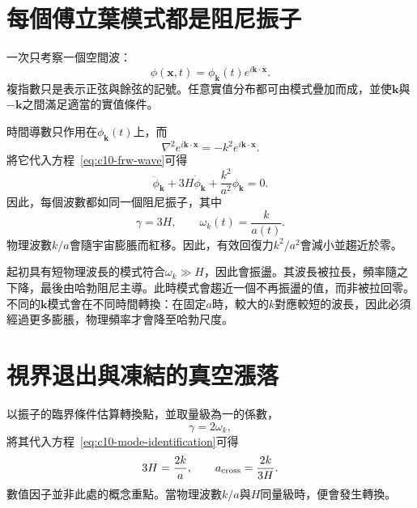 \begin{classroomqa}
\end{classroomqa}

\section{每個傅立葉模式都是阻尼振子}

一次只考察一個空間波：
\begin{equation}
\phi(\mathbf x,t)
=\phi_{\mathbf k}(t)e^{i\mathbf k\cdot\mathbf x}.
\label{eq:c10-mode-ansatz}
\end{equation}
複指數只是表示正弦與餘弦的記號。任意實值分布都可由模式疊加而成，並使\(\mathbf k\)與\(-\mathbf k\)之間滿足適當的實值條件。

時間導數只作用在\(\phi_{\mathbf k}(t)\)上，而
\[
\nabla^2e^{i\mathbf k\cdot\mathbf x}
=-k^2e^{i\mathbf k\cdot\mathbf x}.
\]
將它代入方程~\eqref{eq:c10-frw-wave}可得
\begin{equation}
\ddot\phi_{\mathbf k}
+3H\dot\phi_{\mathbf k}
+\frac{k^2}{a^2}\phi_{\mathbf k}=0.
\label{eq:c10-mode-equation}
\end{equation}
因此，每個波數都如同一個阻尼振子，其中
\begin{equation}
\gamma=3H,
\qquad
\omega_k(t)=\frac{k}{a(t)}.
\label{eq:c10-mode-identification}
\end{equation}
物理波數\(k/a\)會隨宇宙膨脹而紅移。因此，有效回復力\(k^2/a^2\)會減小並趨近於零。

起初具有短物理波長的模式符合\(\omega_k\gg H\)，因此會振盪。其波長被拉長，頻率隨之下降，最後由哈勃阻尼主導。此時模式會趨近一個不再振盪的值，而非被拉回零。不同的\(\mathbf k\)模式會在不同時間轉換：在固定\(a\)時，較大的\(k\)對應較短的波長，因此必須經過更多膨脹，物理頻率才會降至哈勃尺度。

\section{視界退出與凍結的真空漲落}

以振子的臨界條件估算轉換點，並取量級為一的係數，
\[
\gamma=2\omega_k,
\]
將其代入方程~\eqref{eq:c10-mode-identification}可得
\begin{equation}
3H=\frac{2k}{a},
\qquad
a_{\rm cross}=\frac{2k}{3H}.
\label{eq:c10-critical-mode}
\end{equation}
數值因子並非此處的概念重點。當物理波數\(k/a\)與\(H\)同量級時，便會發生轉換。

